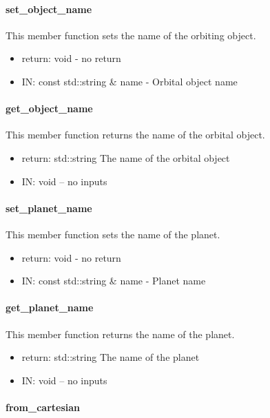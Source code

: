 \paragraph{set\_object\_name}

This member function sets the name of the orbiting object.

\begin{itemize}
\item{return:} void - no return
\item{IN:}    const std::string \& name - Orbital object name
\end{itemize}

\paragraph{get\_object\_name}

This member function returns the name of the orbital object.
\begin{itemize}
\item{return:} std::string The name of the orbital object
\item{IN:}    void -- no inputs
\end{itemize}

\paragraph{set\_planet\_name}

This member function sets the name of the planet.

\begin{itemize}
\item{return:} void - no return
\item{IN:}    const std::string \& name - Planet name
\end{itemize}

\paragraph{get\_planet\_name}

This member function returns the name of the planet.
\begin{itemize}
\item{return:} std::string The name of the planet
\item{IN:}    void -- no inputs
\end{itemize}

\paragraph{from\_cartesian}

